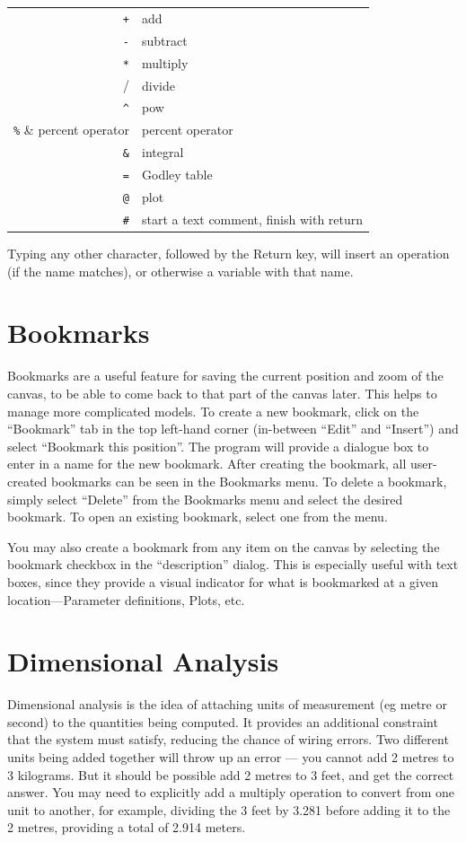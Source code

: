 \begin{tabular}{rl}
  \verb-+- & add\\
  \verb+-+ & subtract \\
  \verb+*+ & multiply\\
  \verb++/ & divide\\
  \verb+^+ & pow\\
  \verb+%+ & percent operator\\
  \verb+&+ & integral\\
  \verb+=+ & Godley table\\
  \verb+@+ & plot\\
  \verb+#+ & start a text comment, finish with return\\
\end{tabular}

Typing any other character, followed by the Return key, will insert
an operation (if the name matches), or otherwise a variable with that
name.

\section{Bookmarks}

Bookmarks are a useful feature for saving the current position and
zoom of the canvas, to be able to come back to that part of the canvas
later. This helps to manage more complicated models. To create a new
bookmark, click on the ``Bookmark'' tab in the top left-hand corner
(in-between ``Edit'' and ``Insert'') and select ``Bookmark this
position''. The program will provide a dialogue box to enter in a
name for the new bookmark. After creating the bookmark, all user-created
bookmarks can be seen in the Bookmarks menu. To delete a bookmark,
simply select ``Delete'' from the Bookmarks menu and select the
desired bookmark. To open an existing bookmark, select one from the
menu.

You may also create a bookmark from any item on the canvas by selecting
the bookmark checkbox in the ``description'' dialog. This is especially
useful with text boxes, since they provide a visual indicator for
what is bookmarked at a given location---Parameter definitions, Plots,
etc.

\section{Dimensional Analysis}

\label{dimensional analysis}

Dimensional analysis is the idea of attaching units of measurement
(eg metre or second) to the quantities being computed. It provides
an additional constraint that the system must satisfy, reducing the
chance of wiring errors. Two different units being added together
will throw up an error --- you cannot add 2 metres to 3 kilograms. But
it should be possible add 2 metres to 3 feet, and get the correct
answer. You may need to explicitly add a multiply operation to convert
from one unit to another, for example, dividing the 3 feet by 3.281
before adding it to the 2 metres, providing a total of 2.914 meters.

